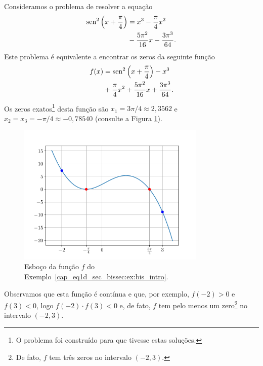 \begin{ex}\label{cap_eq1d_sec_bissec:ex:bis_intro}
  Consideramos o problema de resolver a equação
  \begin{align}
    \operatorname{sen}^2\left(x+\frac{\pi}{4}\right) &= x^3 - \frac{\pi}{4}x^2 \nonumber\\
                                       &- \frac{5\pi^2}{16}x - \frac{3\pi^3}{64}.
  \end{align}
Este problema é equivalente a encontrar os zeros da seguinte função
\begin{align}
  f(x) &= \operatorname{sen}^2\left(x+\frac{\pi}{4}\right) - x^3 \nonumber\\
       &+ \frac{\pi}{4}x^2 + \frac{5\pi^2}{16}x + \frac{3\pi^3}{64}.
\end{align}
Os zeros exatos\footnote{O problema foi construído para que tivesse estas soluções.} desta função são $x_1=3\pi/4\approx 2,3562$ e $x_2=x_3=-\pi/4\approx -0,78540$ (consulte a Figura \ref{cap_eq1d_sec_bissec:fig:bis_intro}).

\begin{figure}[H]
  \centering
  \includegraphics[width=0.8\textwidth]{./cap_eq1d/dados/fig_bis_intro/fig}
  \caption{Esboço da função $f$ do Exemplo~\ref{cap_eq1d_sec_bissec:ex:bis_intro}.}
  \label{cap_eq1d_sec_bissec:fig:bis_intro}
\end{figure}

Observamos que esta função é contínua e que, por exemplo, $f(-2)>0$ e $f(3)<0$, logo $f(-2)\cdot f(3) < 0$ e, de fato, $f$ tem pelo menos um zero\footnote{De fato, $f$ tem três zeros no intervalo $(-2, 3)$.} no intervalo $(-2, 3)$.
\end{ex}

